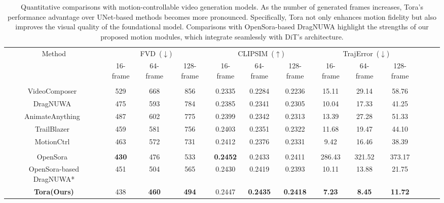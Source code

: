 \begin{table}[!t]\small
\setlength{\tabcolsep}{3pt}
\centering
\begin{tabular}{ccccccccccccc}
\toprule
\multirow{2}{*}{Method} & \multicolumn{3}{c}{FVD~($\downarrow$)} & \multicolumn{3}{c}{CLIPSIM~($\uparrow$)} & \multicolumn{3}{c}{TrajError~($\downarrow$)} \\ \cmidrule(lr){2-4} \cmidrule(lr){5-7} \cmidrule(lr){8-10}
 & 16-frame & 64-frame & 128-frame & 16-frame & 64-frame & 128-frame & 16-frame & 64-frame & 128-frame \\ 
\midrule
\rowcolor{black!10} \multicolumn{1}{l}{\textbf{\textit{UNet-based method}}} &&&&&&&&& \\
VideoComposer~\cite{wang2023videocomposer} & 529 & 668 & 856 & 0.2335 & 0.2284 & 0.2236 & 15.11 & 29.14 & 58.76    \\
DragNUWA~\cite{yin2023dragnuwa} & 475 & 593 & 784 & 0.2385 & 0.2341 & 0.2305 & 10.04 & 17.33 & 41.25    \\
AnimateAnything~\cite{DBLP:journals/corr/abs-2311-12886} & 487 & 602 & 775 & 0.2399 & 0.2342 & 0.2313 & 13.39 & 27.28 & 51.33     \\
TrailBlazer~\cite{DBLP:journals/corr/abs-2401-00896} & 459 & 581 & 756 & 0.2403 & 0.2351 & 0.2322 & 11.68 & 19.47 & 44.10    \\
MotionCtrl~\cite{wang2024motionctrl} & 463 & 572 & 731 & 0.2412 & 0.2376 & 0.2331 & 9.42 & 16.46 & 38.39  \\
\midrule
\rowcolor{black!10} \multicolumn{1}{l}{\textbf{\textit{DiT-based method}}} &&&&&&&&&\\
OpenSora~\cite{OpenSora} & \textbf{430} & 476 & 533  & \textbf{0.2452} & 0.2433 & 0.2411 & 286.43 & 321.52 & 373.17         \\
OpenSora-based DragNUWA*  & 451 & 504 & 565  & 0.2430 & 0.2419 & 0.2393 & 10.11 & 13.88 & 21.75     \\
\textbf{Tora(Ours)} & 438 & \textbf{460} & \textbf{494} & 0.2447 & \textbf{0.2435} & \textbf{0.2418} & \textbf{7.23} & \textbf{8.45} & \textbf{11.72}     \\ 
\bottomrule
\end{tabular}
\caption{
Quantitative comparisons with motion-controllable video generation models. As the number of generated frames
increases, Tora's performance advantage over UNet-based methods becomes more pronounced. Specifically, Tora not only enhances motion fidelity but also improves the visual quality of the foundational model. Comparisons with OpenSora-based DragNUWA highlight the strengths of our proposed motion modules, which integrate seamlessly with DiT’s architecture.}
\label{tab1}
\vspace{-1mm}
\end{table}

